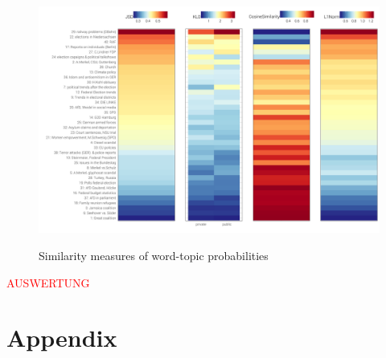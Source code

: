 \documentclass[12pt,a4paper,notitlepage]{article}
\begin{document}
\begin{figure}[H]
	\begin{center}
		\caption{Similarity measures of word-topic probabilities}
		\includegraphics[width=\textwidth,keepaspectratio]{../figs/distance}
		\label{fig_distance}
	\end{center}
\end{figure}

\textcolor{red}{AUSWERTUNG}

\section*{Appendix}
\end{document}
